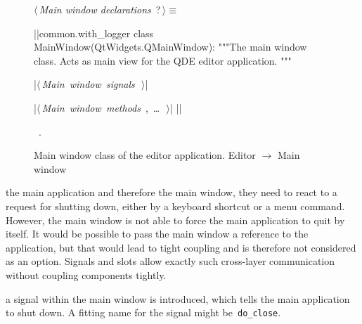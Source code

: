 \documentclass[%
    a4paper,    %
    justified,  %
    nobib,      %
    openany     %
]{tufte-book}
\begin{document}
\begin{figure}
\begin{flushleft} \small
\begin{minipage}{\linewidth}\label{scrap15}\raggedright\small
{} $\langle\,${\itshape Main window declarations}\nobreak\ {\footnotesize {?}}$\,\rangle\equiv$
\vspace{-1ex}
\begin{pythoncode}
|\normalfont{}\fontfamily{}|common.with_logger
class MainWindow(QtWidgets.QMainWindow):
    """The main window class.
    Acts as main view for the QDE editor application.
    """

    |\hbox{$\langle\,${\itshape Main window signals}\nobreak\ {\footnotesize {}}$\,\rangle$}|

    |\hbox{$\langle\,${\itshape Main window methods}\nobreak\ {\footnotesize {}, \ldots\ }$\,\rangle$}|
|\NWsep|
\end{pythoncode}
\vspace{1.5ex}
\footnotesize
\begin{list}{}{\setlength{\itemsep}{-\parsep}\setlength{\itemindent}{-\leftmargin}}
\item \NWtxtMacroRefIn\ .

\item{}
\end{list}
\end{minipage}\vspace{4ex}
\end{flushleft}
\caption{Main window class of the editor application.
  \newline{}\newline{}Editor $\rightarrow$ Main window}
  \label{editor:lst:main-window}
\end{figure}

 the main application and therefore the
main window, they need to react to a request for shutting down, either by a
keyboard shortcut or a menu command. However, the main window is not able to
force the main application to quit by itself. It would be possible to pass the
main window a reference to the application, but that would lead to tight
coupling and is therefore not considered as an option. Signals and slots allow
exactly such cross-layer communication without coupling components tightly.

 a signal within the main window is
introduced, which tells the main application to shut down. A fitting name for
the signal might be~\verb=do_close=.
\end{document}
